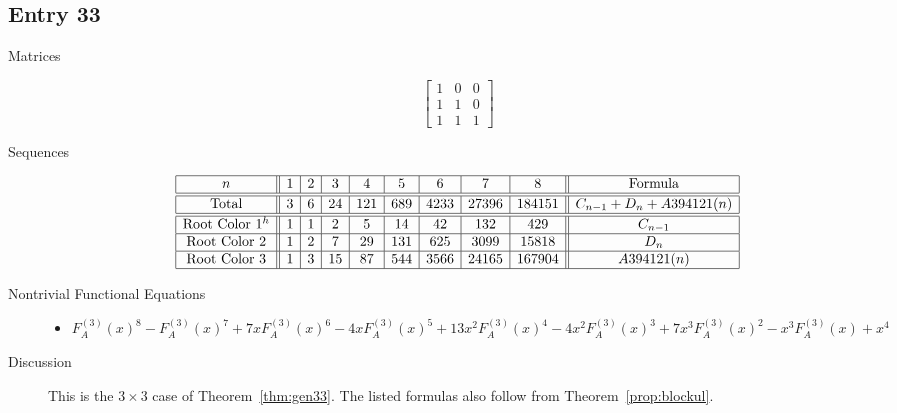 \documentclass[12pt]{amsart}
\newcommand{\gff}[2]{F_{#2}^{(#1)}(x)}
\newcommand{\gfa}[1]{\gff{#1}{A}}
\begin{document}
\subsection*{Entry 33}
\begin{description}
    \item[Matrices]
    
    \[\begin{bmatrix}
1 & 0 & 0 \\
1 & 1 & 0 \\
1 & 1 & 1
\end{bmatrix}\]
    \item[Sequences]\hspace*{\fill}\vspace{-0.5cm}
    \begin{center}
        \[
        \begin{array}{|c||c|c|c|c|c|c|c|c||c|}\hline
           n  & 1 & 2 & 3 & 4 & 5 & 6 & 7 & 8  & \text{Formula}\\\hline\hline
           \text{Total}  & 3 & 6 & 24 & 121 & 689 & 4233 & 27396 & 184151 & C_{n-1}+D_n+A394121(n)\\\hline\hline
           \text{Root Color }1^{h} & 1 & 1 & 2 & 5 & 14 & 42 & 132 & 429 & C_{n-1}\\\hline
           \text{Root Color }2 & 1 & 2 & 7 & 29 & 131 & 625 & 3099 & 15818 & D_n\\\hline
           \text{Root Color }3 & 1 & 3 & 15 & 87 & 544 & 3566 & 24165 & 167904 & A394121(n)\\\hline
        \end{array}
        \]
    \end{center}
    
    \item[Nontrivial Functional Equations]\hspace*{\fill}

    \begin{itemize}
\item $\gfa{3}^8-\gfa{3}^7+7x\gfa{3}^6-4x\gfa{3}^5+13x^2\gfa{3}^4-4x^2\gfa{3}^3+7x^3\gfa{3}^2-x^3\gfa{3}+x^4$


\end{itemize}
    \item[Discussion] This is the $3\times3$ case of Theorem~\ref{thm:gen33}. The listed formulas also follow from Theorem~\ref{prop:blockul}.
\end{description}
\end{document}
